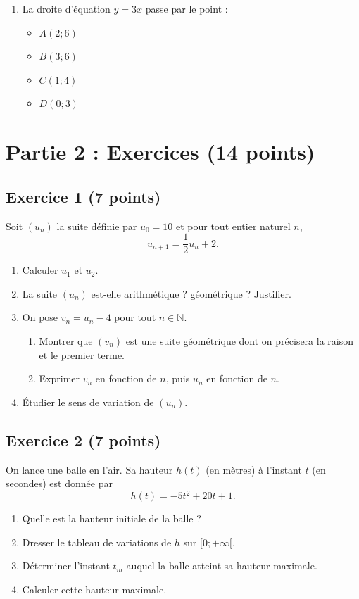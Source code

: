 \documentclass[a4paper, 12pt]{article}
\newcommand{\reponse}{\par\vspace{0.5cm}
\framebox[\linewidth]{\begin{minipage}{\dimexpr\linewidth-2\fboxsep}
\vspace{2.5cm}\hspace{0.5cm}
\end{minipage}}\vspace{0.5cm}
}
\begin{document}
\begin{enumerate}[label=\textbf{Question \arabic*}, leftmargin=*]
\item La droite d’équation $y=3x$ passe par le point :
\begin{itemize}[label=$\square$]
\item[A.] $A(2;6)$
\item[B.] $B(3;6)$
\item[C.] $C(1;4)$
\item[D.] $D(0;3)$
\end{itemize}
\reponse

\end{enumerate}

\newpage

\section*{Partie 2 : Exercices (14 points)}

\subsection*{Exercice 1 (7 points)}
Soit $(u_n)$ la suite définie par $u_0 = 10$ et pour tout entier naturel $n$,
\[
u_{n+1} = \frac{1}{2}u_n + 2.
\]

\begin{enumerate}
    \item Calculer $u_1$ et $u_2$.
    \reponse
    \item La suite $(u_n)$ est‑elle arithmétique ? géométrique ? Justifier.
    \reponse
    \item On pose $v_n = u_n - 4$ pour tout $n\in\mathbb{N}$.
        \begin{enumerate}
            \item Montrer que $(v_n)$ est une suite géométrique dont on précisera la raison et le premier terme.
            \reponse
            \item Exprimer $v_n$ en fonction de $n$, puis $u_n$ en fonction de $n$.
            \reponse
        \end{enumerate}
    \item Étudier le sens de variation de $(u_n)$.
    \reponse
  
\end{enumerate}

\subsection*{Exercice 2 (7 points)}
On lance une balle en l’air. Sa hauteur $h(t)$ (en mètres) à l’instant $t$ (en secondes) est donnée par
\[
h(t) = -5t^2 + 20t + 1.
\]

\begin{enumerate}
    \item Quelle est la hauteur initiale de la balle ?
    \reponse
 \item Dresser le tableau de variations de $h$ sur $[0; +\infty[$.
    \reponse
    \item Déterminer l’instant $t_m$ auquel la balle atteint sa hauteur maximale.
    \reponse
    \item Calculer cette hauteur maximale.
    \reponse
   
   
\end{enumerate}
\end{document}
